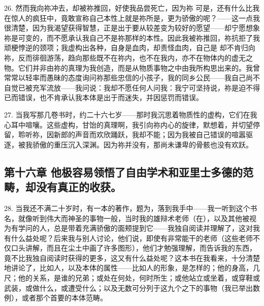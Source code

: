 26. 然而我向祢冲去，却被祢推回，好使我品尝死亡，因为祢 可是，还有什么比我在惊人的疯狂中，竟敢宣称自己本性上就是祢所是，更为骄傲的呢？——这一点我很清楚，因为我渴望获得智慧，正是出于要从较差变为较好的愿望——却宁愿想象祢是可变的，而不愿承认我自己不是祢那样的本性。因此我被祢推回，祢抗拒了我顽梗悖逆的颈项；我虚构出各种，自身是血肉，却责怪血肉，自己是 却不肯归向祢，反而徘徊游荡，趋向那些既不在祢内，也不在我内，亦不在物体内的虚无之物。它们并非由祢的真理为我创造，而是从物质事物之中由我所构思出来的。我曾常常以轻率而愚昧的态度询问祢那些忠信的小孩子，我的同乡公民——我自己尚不自觉已被充军流放——我问说：我却不愿任何人问我：我宁可坚持说，祢是迫不得已而错误，也不肯承认我本体是出于而迷失，并因惩罚而错误。\par

27. 当我写那几卷书时，约二十六七岁——那时我沉思着物质性的虚构，它们在我心耳中喧嚷。这些虚构，甘饴的真理啊，我引向祢内心的旋律，默想着，并切望停留，聆听祢，因新郎的声音而欢欣踊跃，我却不能；因为我被自己错误的喧嚣驱逐，被我骄傲的重压沉入深渊。因为祢并没有，那尚未谦卑的骨骸也没有欢跃。\par


\subsection{第十六章 他极容易领悟了自由学术和亚里士多德的范畴，却没有真正的收获。}

28. 当我还不满二十岁时，有一本的著作，题为，落到我手中——我一听到这个书名，就像听到伟大而神圣的事物一般，当时我的雄辩术老师（在），以及其他被视为有学问的人，总是带着充满骄傲的面颊提到它——我独自阅读并理解了，这对我有什么益处呢？后来我与别人讨论，他们说，即使有非常能干的老师（这些老师不仅口头讲解，而且在尘土中画了许多图形），他们才勉强理解，而告诉我的东西，竟不比我独自阅读时获得的更多，这又有什么益处呢？这本书在我看来，十分清楚地讲论了，比如人，以及本体的属性——比如人的形象，是怎样的；他的身高，几尺；他的关系，是谁的兄弟；或处在何处，何时所生；或他站立或坐着，或穿鞋或武装，或做什么，或遭受什么；以及无数可分列于这九个之下的事物（我已举出数例），或者那个首要的本体范畴。\par

